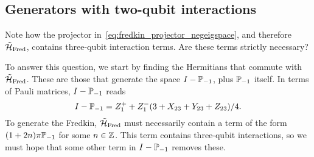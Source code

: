 \subsection{Generators with two-qubit interactions}
Note how the projector in~\cref{eq:fredkin_projector_negeigspace}, and therefore $\tilde{{\mathcal{H}}}_{\operatorname{Fred}}$, contains three-qubit interaction terms.
Are these terms strictly necessary?

To answer this question, we start by finding the Hermitians that commute with $\tilde{{\mathcal{H}}}_{\operatorname{Fred}}$.
These are those that generate the space $I-\mathbb{P}_{-1}$, plus $\mathbb{P}_{-1}$ itself.
In terms of Pauli matrices, $I-\mathbb{P}_{-1}$ reads
\begin{equation}
    I - \mathbb{P}_{-1} = Z_1^+ + Z_1^- (3 + X_{23} + Y_{23} + Z_{23})/4.
\end{equation}
To generate the Fredkin, $\tilde{{\mathcal{H}}}_{\operatorname{Fred}}$ must necessarily contain a term of the form
$(1 + 2n)\pi \mathbb{P}_{-1}$ for some $n\in\mathbb{Z}$.
This term contains three-qubit interactions, so we must hope that some other term in $I-\mathbb{P}_{-1}$ removes these.



